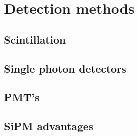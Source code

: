 \chapter{Detection methods} \label{chap:detection_methods}

\section{Scintillation}

\section{Single photon detectors}

\section{PMT's}

\section{SiPM advantages}